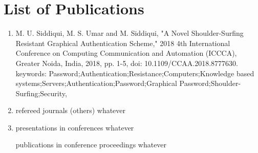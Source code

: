 \chapter*{List of Publications}
\thispagestyle{empty}
\begin{enumerate}
    \item M. U. Siddiqui, M. S. Umar and M. Siddiqui, "A Novel Shoulder-Surfing Resistant Graphical Authentication Scheme," 2018 4th International Conference on Computing Communication and Automation (ICCCA), Greater Noida, India, 2018, pp. 1-5, doi: 10.1109/CCAA.2018.8777630. keywords: {Password;Authentication;Resistance;Computers;Knowledge based systems;Servers;Authentication;Password;Graphical Password;Shoulder-Surfing;Security},

 \par
    \item refereed journals (others)
        whatever \par
    \item presentations in conferences
        whatever \par
    \itemhead publications in conference proceedings
        whatever \par
\end{enumerate}
\vfill
